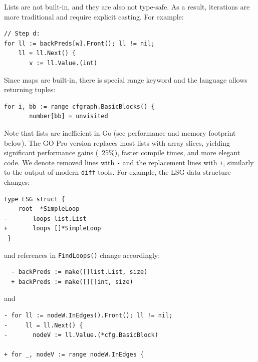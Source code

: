 Lists are not built-in, and they are also not type-safe. As a result,
iterations are more traditional and require explicit casting. For
example:

\begin{footnotesize}
\begin{verbatim}
// Step d:
for ll := backPreds[w].Front(); ll != nil; 
    ll = ll.Next() {
       v := ll.Value.(int)
\end{verbatim}
\end{footnotesize}

Since maps are built-in, there is special range keyword and the language allows returning tuples:

\begin{footnotesize}
\begin{verbatim}
for i, bb := range cfgraph.BasicBlocks() {
       number[bb] = unvisited
\end{verbatim}
\end{footnotesize}

Note that lists are inefficient in Go (see performance and memory
footprint below). The GO Pro version replaces most lists with array
slices, yielding significant performance gains (~25\%),
faster compile times, and more
elegant code.  We denote removed lines with {\tt -} and the replacement
lines with {\tt +}, similarly to the output of modern {\tt diff} tools.
For example, the LSG data structure changes:

\begin{footnotesize}
\begin{verbatim}
type LSG struct {
 	root  *SimpleLoop
-       loops list.List
+       loops []*SimpleLoop
 }
\end{verbatim}
\end{footnotesize}

and references in {\tt FindLoops()} change accordingly:

\begin{footnotesize}
\begin{verbatim}
  - backPreds := make([]list.List, size)
  + backPreds := make([][]int, size)
\end{verbatim}
\end{footnotesize}

and

\begin{footnotesize}
\begin{verbatim}
- for ll := nodeW.InEdges().Front(); ll != nil; 
-     ll = ll.Next() {
-       nodeV := ll.Value.(*cfg.BasicBlock)

+ for _, nodeV := range nodeW.InEdges {
\end{verbatim}
\end{footnotesize}

